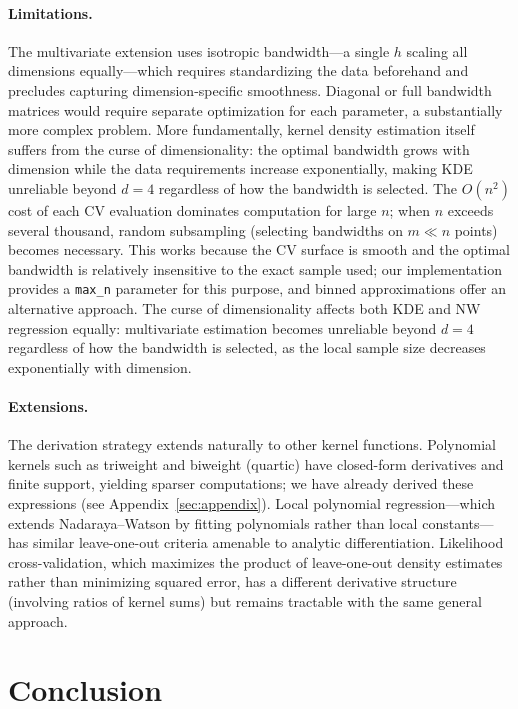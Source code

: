 \documentclass[11pt]{article}
\theoremstyle{definition}
\theoremstyle{remark}
\begin{document}
\paragraph{Limitations.}
The multivariate extension uses isotropic bandwidth---a single $h$ scaling all dimensions equally---which requires standardizing the data beforehand and precludes capturing dimension-specific smoothness.
Diagonal or full bandwidth matrices would require separate optimization for each parameter, a substantially more complex problem.
More fundamentally, kernel density estimation itself suffers from the curse of dimensionality: the optimal bandwidth grows with dimension while the data requirements increase exponentially, making KDE unreliable beyond $d = 4$ regardless of how the bandwidth is selected.
The $O(n^2)$ cost of each CV evaluation dominates computation for large $n$; when $n$ exceeds several thousand, random subsampling (selecting bandwidths on $m \ll n$ points) becomes necessary.
This works because the CV surface is smooth and the optimal bandwidth is relatively insensitive to the exact sample used; our implementation provides a \texttt{max\_n} parameter for this purpose, and binned approximations \citep{wand1994fast} offer an alternative approach.
The curse of dimensionality affects both KDE and NW regression equally: multivariate estimation becomes unreliable beyond $d = 4$ regardless of how the bandwidth is selected, as the local sample size decreases exponentially with dimension.

\paragraph{Extensions.}
The derivation strategy extends naturally to other kernel functions.
Polynomial kernels such as triweight and biweight (quartic) have closed-form derivatives and finite support, yielding sparser computations; we have already derived these expressions (see Appendix~\ref{sec:appendix}).
Local polynomial regression---which extends Nadaraya--Watson by fitting polynomials rather than local constants---has similar leave-one-out criteria amenable to analytic differentiation.
Likelihood cross-validation, which maximizes the product of leave-one-out density estimates rather than minimizing squared error, has a different derivative structure (involving ratios of kernel sums) but remains tractable with the same general approach.

\section{Conclusion}
\end{document}
